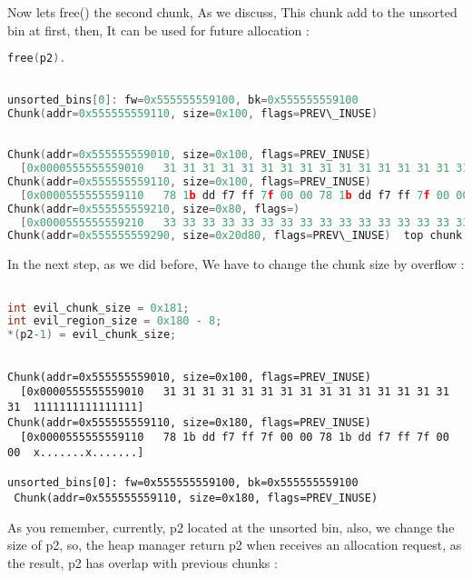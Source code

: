 \documentclass{masterthesis}
\begin{document}
Now lets free() the second chunk, As we discuss, This chunk add to the unsorted bin at first, then, It can be used for future allocation :

\begin{lstlisting}[language=c,frame=tlrb]
free(p2).
 \end{lstlisting}

\begin{lstlisting}[language=c,frame=tlrb]

unsorted_bins[0]: fw=0x555555559100, bk=0x555555559100
Chunk(addr=0x555555559110, size=0x100, flags=PREV\_INUSE)
\end{lstlisting}

\begin{lstlisting}[language=c,frame=tlrb]

Chunk(addr=0x555555559010, size=0x100, flags=PREV_INUSE)
  [0x0000555555559010   31 31 31 31 31 31 31 31 31 31 31 31 31 31 31 31  1111111111111111]
Chunk(addr=0x555555559110, size=0x100, flags=PREV_INUSE)
  [0x0000555555559110   78 1b dd f7 ff 7f 00 00 78 1b dd f7 ff 7f 00 00  x.......x.......]
Chunk(addr=0x555555559210, size=0x80, flags=)
  [0x0000555555559210   33 33 33 33 33 33 33 33 33 33 33 33 33 33 33 33  3333333333333333]
Chunk(addr=0x555555559290, size=0x20d80, flags=PREV\_INUSE)  top chunk

 \end{lstlisting}
In the next step, as we did before, We have to change the chunk size by overflow :
\begin{lstlisting}[language=c,frame=tlrb]

int evil_chunk_size = 0x181;
int evil_region_size = 0x180 - 8;
*(p2-1) = evil_chunk_size;
 \end{lstlisting}
\begin{lstlisting}[frame=tlrb]

Chunk(addr=0x555555559010, size=0x100, flags=PREV_INUSE)
  [0x0000555555559010   31 31 31 31 31 31 31 31 31 31 31 31 31 31 31 31  1111111111111111]
Chunk(addr=0x555555559110, size=0x180, flags=PREV_INUSE)
  [0x0000555555559110   78 1b dd f7 ff 7f 00 00 78 1b dd f7 ff 7f 00 00  x.......x.......]

unsorted_bins[0]: fw=0x555555559100, bk=0x555555559100
 Chunk(addr=0x555555559110, size=0x180, flags=PREV_INUSE)
 \end{lstlisting}
 
As you remember, currently, p2 located at the unsorted bin, also, we change the size of p2, so, the heap manager return p2 when receives an allocation request, as the result, p2 has overlap with previous chunks :
\end{document}
